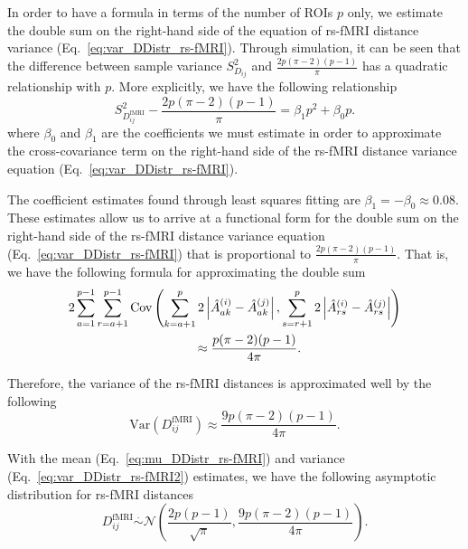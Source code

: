\documentclass[aos]{imsart}
\begin{document}
In order to have a formula in terms of the number of ROIs $p$ only, we estimate the double sum on the right-hand side of the equation of rs-fMRI distance variance (Eq.~\ref{eq:var_DDistr_rs-fMRI}). Through simulation, it can be seen that the difference between sample variance $S^2_{D_{ij}}$ and $\frac{2p(\pi-2)(p-1)}{\pi}$ has a quadratic relationship with $p$. More explicitly, we have the following relationship
%
\begin{equation}\label{eq:estimate_cov}
S^2_{D^\text{fMRI}_{ij}} - \frac{2p(\pi-2)(p-1)}{\pi} = \beta_1 p^2 + \beta_0 p.
\end{equation}
%
where $\beta_0$ and $\beta_1$ are the coefficients we must estimate in order to approximate the cross-covariance term on the right-hand side of the rs-fMRI distance variance equation (Eq.~\ref{eq:var_DDistr_rs-fMRI}).

The coefficient estimates found through least squares fitting are $\beta_1 = - \beta_0 \approx 0.08$. These estimates allow us to arrive at a functional form for the double sum on the right-hand side of the rs-fMRI distance variance equation (Eq.~\ref{eq:var_DDistr_rs-fMRI}) that is proportional to $\frac{2p(\pi-2)(p-1)}{\pi}$. That is, we have the following formula for approximating the double sum
%
\begin{equation}\label{eq:estimate_cov_form}
\begin{aligned}
&2\sum_{a = 1}^{p-1} \sum_{r=a+1}^{p-1} \text{Cov}\left(\sum_{k=a+1}^{p} 2\left|\hat{A}^{(i)}_{ak} - \hat{A}^{(j)}_{ak}\right|, \sum_{s=r+1}^{p} 2\left|\hat{A}^{(i)}_{rs} - \hat{A}^{(j)}_{rs}\right|\right) \\ &\hspace{3.5cm}\approx \frac{p(\pi - 2)(p - 1)}{4\pi}.
\end{aligned}
\end{equation}

Therefore, the variance of the rs-fMRI distances is approximated well by the following
%
\begin{equation}\label{eq:var_DDistr_rs-fMRI2}
\text{Var}(D^\text{fMRI}_{ij}) \approx \frac{9p(\pi - 2)(p-1)}{4\pi}.
\end{equation}

With the mean (Eq.~\ref{eq:mu_DDistr_rs-fMRI}) and variance (Eq.~\ref{eq:var_DDistr_rs-fMRI2}) estimates, we have the following asymptotic distribution for rs-fMRI distances
%
\begin{equation}\label{eq:DDistr_rs-fMRI}
D^\text{fMRI}_{ij} \overset{.}{\sim} \mathcal{N}\left(\frac{2p(p-1)}{\sqrt{\pi}}, \frac{9p(\pi - 2)(p-1)}{4\pi}\right).
\end{equation}
\end{document}
